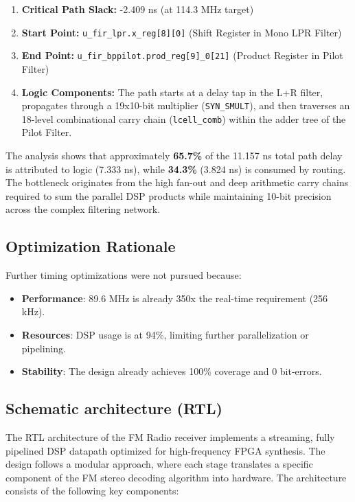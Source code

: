 \begin{enumerate}
    \item \textbf{Critical Path Slack:} -2.409 ns (at 114.3 MHz target)
    \item \textbf{Start Point:} \texttt{u\_fir\_lpr.x\_reg[8][0]} (Shift Register in Mono LPR Filter)
    \item \textbf{End Point:} \texttt{u\_fir\_bppilot.prod\_reg[9]\_0[21]} (Product Register in Pilot Filter)
    \item \textbf{Logic Components:} The path starts at a delay tap in the L+R filter, propagates through a 19x10-bit multiplier (\texttt{SYN\_SMULT}), and then traverses an 18-level combinational carry chain (\texttt{lcell\_comb}) within the adder tree of the Pilot Filter.
\end{enumerate}

The analysis shows that approximately \textbf{65.7\%} of the 11.157 ns total path delay is attributed to logic (7.333 ns), while \textbf{34.3\%} (3.824 ns) is consumed by routing. The bottleneck originates from the high fan-out and deep arithmetic carry chains required to sum the parallel DSP products while maintaining 10-bit precision across the complex filtering network.

\subsection{Optimization Rationale}
Further timing optimizations were not pursued because:
\begin{itemize}
    \item \textbf{Performance}: 89.6 MHz is already 350x the real-time requirement (256 kHz).
    \item \textbf{Resources}: DSP usage is at 94\%, limiting further parallelization or pipelining.
    \item \textbf{Stability}: The design already achieves 100\% coverage and 0 bit-errors.
\end{itemize}

\subsection{Schematic architecture (RTL)}

The RTL architecture of the FM Radio receiver implements a streaming, fully pipelined DSP datapath optimized for high-frequency FPGA synthesis. The design follows a modular approach, where each stage translates a specific component of the FM stereo decoding algorithm into hardware. The architecture consists of the following key components:

